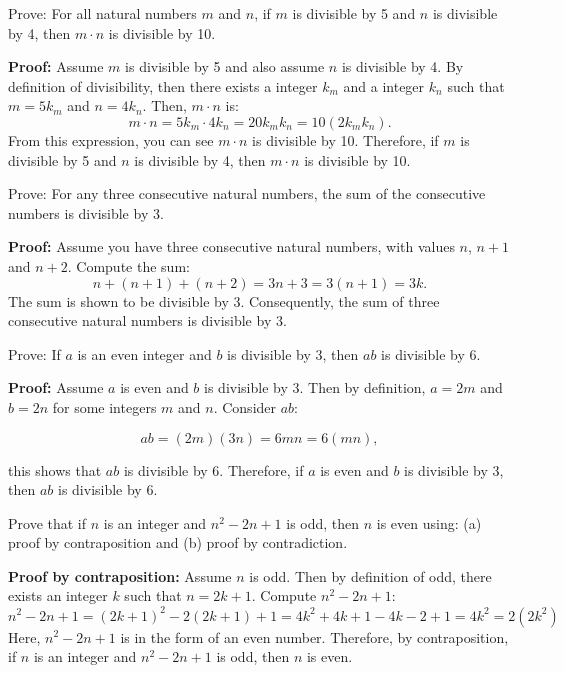 \begin{questions}
 Prove: For all natural numbers $m$ and $n$, if $m$ is divisible by 5 and $n$ is divisible by 4, then $m\cdot n$ is divisible by 10.
    \ifprintanswers
        \vspace{-10pt}
    \fi
  \begin{solution} \textbf{Proof:} Assume $m$ is divisible by 5 and also assume $n$ is divisible by 4.  By definition of divisibility, then there exists a integer $k_m$ and a integer $k_n$ such that $m = 5k_m$ and $n=4k_n$.  Then, $m\cdot n$ is:
    \[ m\cdot n = 5k_m \cdot 4k_n = 20k_mk_n = 10(2k_mk_n). \]
  From this expression, you can see $m\cdot n$ is divisible by 10.  Therefore, if $m$ is divisible by 5 and $n$ is divisible by 4, then $m \cdot n$ is divisible by 10.
  \end{solution}



 Prove: For any three consecutive natural numbers, the sum of the consecutive numbers is divisible by 3.
    \ifprintanswers
        \vspace{-10pt}
    \fi
  \begin{solution} \textbf{Proof:} Assume you have three consecutive natural numbers, with values $n$, $n+1$ and $n+2$.  Compute the sum:
    \[ n + (n+1) + (n+2) = 3n+3 = 3(n+1) = 3k. \]
  The sum is shown to be divisible by 3.  Consequently, the sum of three consecutive natural numbers is divisible by 3.
  \end{solution}




 Prove: If $a$ is an even integer and $b$ is divisible by 3, then $ab$ is divisible by 6. 
    \ifprintanswers
        \vspace{-10pt}
    \fi
\begin{solution}
\textbf{Proof:}  Assume $a$ is even and $b$ is divisible by 3.  Then by definition, $a = 2m$ and $b=2n$ for some integers $m$ and $n$.  Consider $ab$: 

\[ ab = (2m)(3n) = 6mn = 6(mn), \]

this shows that $ab$ is divisible by 6.  Therefore, if $a$ is even and $b$ is divisible by 3, then $ab$ is divisible by 6.
\end{solution}




  Prove that if $n$ is an integer and $n^2 - 2n + 1$ is odd,
then $n$ is even using: (a) proof by contraposition and (b) proof by
contradiction.
    \ifprintanswers
        \vspace{-10pt}
    \fi
\begin{solution} \textbf{Proof by contraposition:}
    Assume $n$ is odd.  Then by definition of odd, there exists an
    integer $k$ such that $n=2k+1$.  Compute $n^2 - 2n + 1$:
    \[ n^2 - 2n + 1 = (2k+1)^2 - 2(2k+1) + 1 = 4k^2 + 4k + 1 - 4k - 2 + 1 = 4k^2 = 2(2k^2) \]
    Here, $n^2 - 2n + 1$ is in the form of an even number.  Therefore, by
    contraposition, if $n$ is an integer and $n^2 - 2n + 1$ is odd,
    then $n$ is even.


\end{solution}
\end{questions}
